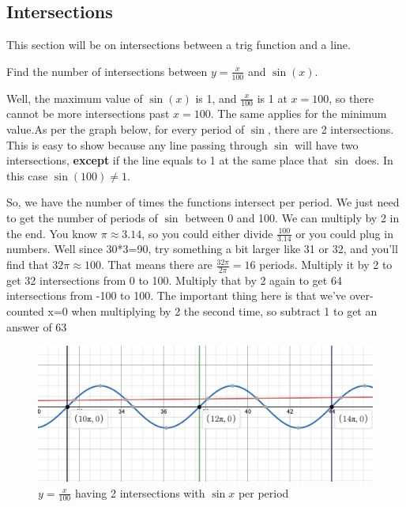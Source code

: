 \documentclass{article}
\begin{document}
\subsection{Intersections}
This section will be on intersections between a trig function and a line.
\begin{example}
\begin{problem}
Find the number of intersections between $y=\frac{x}{100}$ and $\sin(x)$.
\end{problem}

\vspace{5mm}
\noindent Well, the maximum value of $\sin(x)$ is 1, and $\frac{x}{100}$ is 1 at $x=100$, so there cannot be more intersections past $x=100$. The same applies for the minimum value.As per the graph below, for every period of $\sin$, there are 2 intersections. This is easy to show because any line passing through $\sin$ will have two intersections, \textbf{except} if the line equals to 1 at the same place that $\sin$ does. In this case $\sin(100)\neq 1$.

\vspace{5mm}
So, we have the number of times the functions intersect per period. We just need to get the number of periods of $\sin$ between 0 and 100. We can multiply by 2 in the end. You know $\pi \approx 3.14$, so you could either divide $\frac{100}{3.14}$ or you could plug in numbers. Well since 30*3=90, try something a bit larger like 31 or 32, and you'll find that $32\pi\approx100$. That means there are $\frac{32\pi}{2\pi}=16$ periods. Multiply it by 2 to get 32 intersections from 0 to 100. Multiply that by 2 again to get 64 intersections from -100 to 100. The important thing here is that we've over-counted x=0 when multiplying by 2 the second time, so subtract 1 to get an answer of $\boxed{63}$

\begin{figure}[H]
    \centering
    \includegraphics[width=12cm]{Intersections.png}
    \caption{$y=\frac{x}{100}$ having 2 intersections with $\sin{x}$ per period}
    \label{fig:my_label}
\end{figure}

\end{example}
\end{document}
